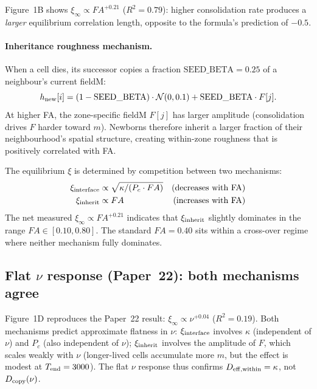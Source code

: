\documentclass[11pt]{article}
\begin{document}
Figure~1B shows $\xi_\infty \propto FA^{+0.21}$ ($R^2=0.79$):
higher consolidation rate produces a \emph{larger} equilibrium correlation length,
opposite to the formula's prediction of $-0.5$.

\paragraph{Inheritance roughness mechanism.}
When a cell dies, its successor copies a fraction $\mathrm{SEED\_BETA}=0.25$
of a neighbour's current fieldM:
\begin{equation}
  h_{\rm new}[i] = (1-\mathrm{SEED\_BETA})\cdot\mathcal{N}(0,0.1)
                   + \mathrm{SEED\_BETA}\cdot F[j].
\end{equation}
At higher FA, the zone-specific fieldM $F[j]$ has larger amplitude
(consolidation drives $F$ harder toward $m$).
Newborns therefore inherit a larger fraction of their neighbourhood's
spatial structure, creating within-zone roughness that is positively correlated
with FA.

The equilibrium $\xi$ is determined by competition between two mechanisms:
\begin{align}
  \xi_{\rm interface}  &\propto \sqrt{\kappa/(P_c\cdot FA)} & \text{(decreases with FA)}\\
  \xi_{\rm inherit}    &\propto FA                           & \text{(increases with FA)}
\end{align}
The net measured $\xi_\infty \propto FA^{+0.21}$ indicates that
$\xi_{\rm inherit}$ slightly dominates in the range $FA \in [0.10, 0.80]$.
The standard $FA=0.40$ sits within a cross-over regime where neither
mechanism fully dominates.

\subsection{Flat $\nu$ response (Paper~22): both mechanisms agree}

Figure~1D reproduces the Paper~22 result: $\xi_\infty \propto \nu^{+0.04}$ ($R^2=0.19$).
Both mechanisms predict approximate flatness in $\nu$:
$\xi_{\rm interface}$ involves $\kappa$ (independent of $\nu$) and $P_c$ (also
independent of $\nu$);
$\xi_{\rm inherit}$ involves the amplitude of $F$, which scales weakly with $\nu$
(longer-lived cells accumulate more $m$, but the effect is modest at $T_{\rm end}=3000$).
The flat $\nu$ response thus confirms $D_{\rm eff,within} = \kappa$, not $D_{\rm copy}(\nu)$.

\end{document}
